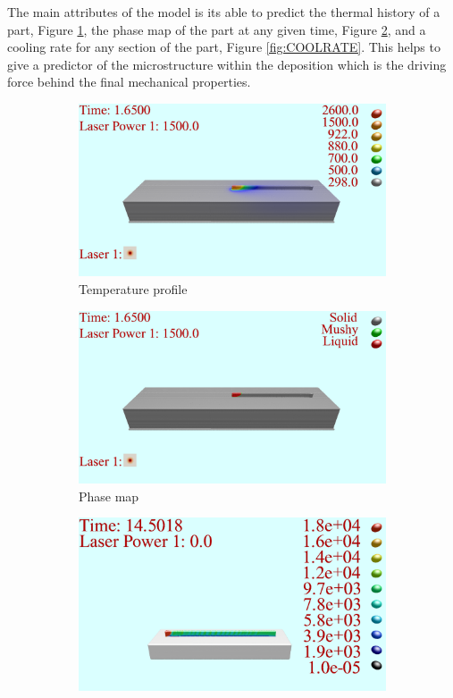 \documentclass[pdflatex,sn-mathphys]{sn-jnl}
\begin{document}
	The main attributes of the model is its able to predict the thermal history of a part, Figure \ref{fig:TEMP}, the phase map of the part at any given time, Figure \ref{fig:PHASE}, and a cooling rate for any section of the part, Figure \ref{fig:COOLRATE}.  This helps to give a predictor of the microstructure within the deposition which is the driving force behind the final mechanical properties. 
	\begin{figure}[!htb]\centering
		\begin{subfigure}[c]{0.3\textwidth}
		\centering
		\includegraphics[width=\textwidth]{TEMP}
		\caption{Temperature profile}
		\label{fig:TEMP}
		\end{subfigure}
			\begin{subfigure}[c]{0.3\textwidth}
			\centering
			\includegraphics[width=\textwidth]{PHASE}
			\caption{Phase map}
			\label{fig:PHASE}
			\end{subfigure}
				\begin{subfigure}[c]{0.3\textwidth}
				\centering
				\includegraphics[width=\textwidth]{COOLRATE}

\end{subfigure}
\end{figure}
\end{document}
